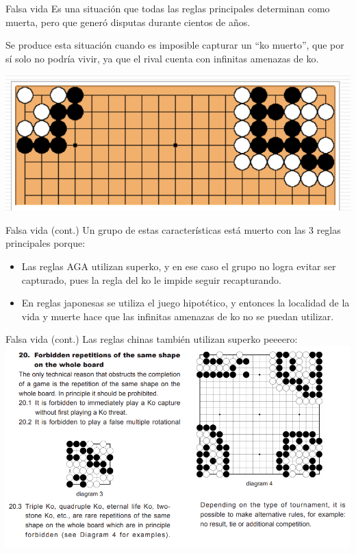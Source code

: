 \documentclass{beamer}
\begin{document}
\begin{frame}{Falsa vida}
    Es una situación que todas las reglas principales determinan como muerta, pero que generó disputas durante cientos de años.
    
    Se produce esta situación cuando es imposible capturar un ``ko muerto'', que por sí solo no podría vivir, ya que el rival cuenta con infinitas amenazas de ko. 
    
    \includegraphics[scale=0.4]{falsa-vida.png}
\end{frame}

\begin{frame}{Falsa vida (cont.)}
    Un grupo de estas características está muerto con las 3 reglas principales porque:
    \begin{itemize}
        \item Las reglas AGA utilizan superko, y en ese caso el grupo no logra evitar ser capturado, pues la regla del ko le impide seguir recapturando.
        \item En reglas japonesas se utiliza el juego hipotético, y entonces la localidad de la vida y muerte hace que las infinitas amenazas de ko no se puedan utilizar.
    \end{itemize}
\end{frame}

\begin{frame}{Falsa vida (cont.)}
    Las reglas chinas también utilizan superko peeeero:
    \includegraphics[scale=0.39]{chinesesuperko.png}
\end{frame}
\end{document}
